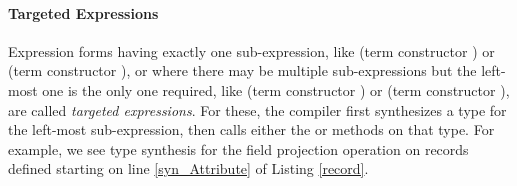 \paragraph{Targeted Expressions} Expression forms having exactly one sub-expression, like  (term constructor ) or  (term constructor ), or where there may be multiple sub-expressions but the left-most one is the only one required, like  (term constructor  ) or  (term constructor ), are called \emph{targeted expressions}. For these, the compiler first synthesizes a type for the left-most sub-expression, then calls either the  or  methods on that type. For example, we see type synthesis for the field projection operation on records defined starting on line \ref{syn_Attribute} of Listing \ref{record}.%

